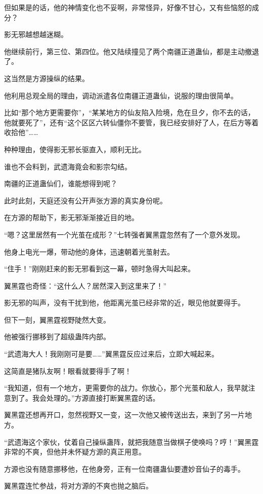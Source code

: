 \begin{this_body}
但如果是的话，他的神情变化也不妥啊，非常怪异，好像不甘心，又有些恼怒的成分？

影无邪越想越迷糊。

他继续前行，第三位、第四位。他又陆续撞见了两个南疆正道蛊仙，都是主动撤退了。

这当然是方源操纵的结果。

他利用总观全局的理由，调动派遣各位南疆正道蛊仙，说服的理由很简单。

比如“那个地方更需要你”，“某某地方的仙友陷入险境，危在旦夕，你不去的话，他就要死了”，还有“这个区区六转仙僵你不要管，我已经安排好了人，在后方等着收拾他”……

种种理由，使得影无邪长驱直入，顺利无比。

谁也不会料到，武遗海竟会和影宗勾结。

南疆的正道蛊仙们，谁能想得到呢？

此时此刻，天庭还没有公开声张方源的真实身份呢。

在方源的帮助下，影无邪渐渐接近目的地。

“嗯？这里居然有一个光茧在成形？”七转强者翼黑霆忽然有了一个意外发现。

他身上电光一爆，带动他的身体，迅速朝着光茧射去。

“住手！”刚刚赶来的影无邪看到这一幕，顿时急得大叫起来。

翼黑霆也奇怪：“这什么人？居然深入到这里来了！”

影无邪的叫声，没有干扰到他，他距离光茧已经非常的近，眼见他就要得手。

但下一刻，翼黑霆视野陡然大变。

他被强行挪移到了超级蛊阵内部。

“武遗海大人！我刚刚可是要……”翼黑霆反应过来后，立即大喊起来。

这简直是猪队友啊！眼看就要得手了啊！

“我知道，但有一个地方，更需要你的战力。你放心，那个光茧和敌人，我早就注意到了。我会处理的。”方源直接打断翼黑霆的话。

翼黑霆还想再开口，忽然视野又一变，这一次他又被传送出去，来到了另一片地方。

“武遗海这个家伙，仗着自己操纵蛊阵，就把我随意当做棋子使唤吗？哼！”翼黑霆非常的不爽，但他并未怀疑方源的真正用意。

方源也没有随意挪移他，在他身旁，正有一位南疆蛊仙要遭妙音仙子的毒手。

翼黑霆连忙参战，将对方源的不爽也抛之脑后。


\end{this_body}
